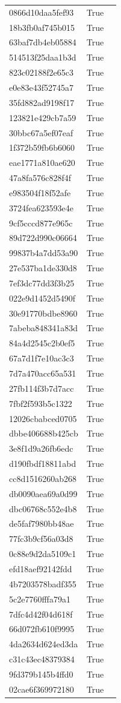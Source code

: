 \begin{tabular}{lrl}
0866d10daa5fef93 & True &  \\
18b3fb0af745b015 & True &  \\
63baf7db4eb05884 & True &  \\
514513f25daa1b3d & True &  \\
823c02188f2e65c3 & True &  \\
e0e83e43f52745a7 & True &  \\
35fd882ad9198f17 & True &  \\
123821e429cb7a59 & True &  \\
30bbc67a5ef07eaf & True &  \\
1f372b59fb6b6060 & True &  \\
eae1771a810ae620 & True &  \\
47a8fa576c828f4f & True &  \\
e983504f18f52afe & True &  \\
3724fea623593e4e & True &  \\
9cf5cccd877e965c & True &  \\
89d722d990c06664 & True &  \\
99837b4a7dd53a90 & True &  \\
27e537ba1de330d8 & True &  \\
7ef3dc77dd3f3b25 & True &  \\
022e9d1452d5490f & True &  \\
30e91770bdbe8960 & True &  \\
7abeba848341a83d & True &  \\
84a4d2545c2b0ef5 & True &  \\
67a7d1f7e10ac3c3 & True &  \\
7d7a470acc65a531 & True &  \\
27fb114f3b7d7acc & True &  \\
7fbf2f593b5c1322 & True &  \\
12026cbabced0705 & True &  \\
dbbe406688b425cb & True &  \\
3e8f1d9a26fb6edc & True &  \\
d190fbdf18811abd & True &  \\
cc8d1516260ab268 & True &  \\
db0090aea69a0d99 & True &  \\
dbc06768c552e4b8 & True &  \\
de5faf7980bb48ae & True &  \\
77fc3b9cf56a03d8 & True &  \\
0c88e9d2da5109c1 & True &  \\
efd18aef92142fdd & True &  \\
4b7203578badf355 & True &  \\
5c2e7760fffa79a1 & True &  \\
7dfc4d42f04d618f & True &  \\
66d072fb610f9995 & True &  \\
4da2634d624ed3da & True &  \\
c31c43ec48379384 & True &  \\
9fd379b145b4ffd0 & True &  \\
02cae6f369972180 & True &  \\
\bottomrule
\end{tabular}
